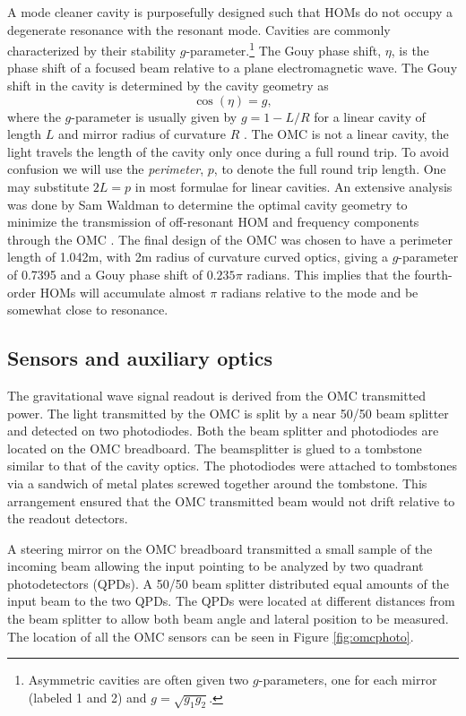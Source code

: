 A mode cleaner cavity is purposefully designed such that HOMs do not occupy a degenerate resonance with the resonant  mode. %
Cavities are commonly characterized by their stability $g$-parameter.\footnote{Asymmetric cavities are often given two $g$-parameters, one for each mirror (labeled 1 and 2) and $g=\sqrt{g_1 g_2}$.} The Gouy phase shift, $\eta$, is the phase shift of a focused  beam relative to a plane electromagnetic wave. %
The Gouy shift in the cavity is determined by the cavity geometry as
\begin{equation}
\label{eqn:gouyg}
\cos(\eta)=g,
\end{equation}
where the $g$-parameter is usually given by $g=1-L/R$ for a linear cavity of length $L$ and mirror radius of curvature $R$ \cite{T080208}. %
The OMC is not a linear cavity, the light travels the length of the cavity only once during a full round trip. %
To avoid confusion we will use the \emph{perimeter}, $p$, to denote the full round trip length. %
One may substitute $2L=p$ in most formulae for linear cavities. %
An extensive analysis was done by Sam Waldman to determine the optimal cavity geometry to minimize the transmission of off-resonant HOM and frequency components through the OMC \cite{T080144}. %
The final design of the OMC was chosen to have a perimeter length of 1.042m, with 2m radius of curvature curved optics, giving a $g$-parameter of 0.7395 and a Gouy phase shift of $0.235\pi$ radians. %
This implies that the fourth-order HOMs will accumulate almost $\pi$ radians relative to the  mode and be somewhat close to resonance.

\subsection{Sensors and auxiliary optics}

The gravitational wave signal readout is derived from the OMC transmitted power. %
The light transmitted by the OMC is split by a near 50/50 beam splitter and detected on two photodiodes. %
Both the beam splitter and photodiodes are located on the OMC breadboard. %
The beamsplitter is glued to a tombstone similar to that of the cavity optics. %
The photodiodes were attached to tombstones via a sandwich of metal plates screwed together around the tombstone. %
This arrangement ensured that the OMC transmitted beam would not drift relative to the readout detectors.

A steering mirror on the OMC breadboard transmitted a small sample of the incoming beam allowing the input pointing to be analyzed by two quadrant photodetectors (QPDs). %
A 50/50 beam splitter distributed equal amounts of the input beam to the two QPDs. %
The QPDs were located at different distances from the beam splitter to allow both beam angle and lateral position to be measured. %
The location of all the OMC sensors can be seen in Figure \ref{fig:omcphoto}.

